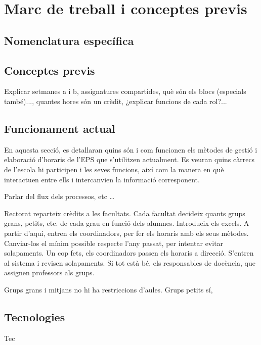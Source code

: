 \documentclass[a4paper,12pt]{ThesisStyle}
\begin{document}
\chapter{Marc de treball i conceptes previs}  %
\label{cap:marcdetreball}

\section{Nomenclatura específica}
\label{sec:nomenclatura}

\section{Conceptes previs}
\label{sec:conceptes_previs}
Explicar setmanes a i b, assignatures compartides, què són els blocs (especials també)..., quantes hores
són un crèdit, ¿explicar funcions de cada rol?...

\section{Funcionament actual}
\label{sec:funcionament_actual}

En aquesta secció, es detallaran quins són i com funcionen els mètodes de gestió i elaboració d'horaris de l'EPS que s'utilitzen actualment. Es veuran quins càrrecs de l'escola hi participen i les seves funcions, així com la manera en què interactuen entre ells i intercanvien la informació corresponent.

Parlar del flux dels processos, etc \ldots

Rectorat reparteix crèdits a les facultats. Cada facultat decideix quants grups grans, petits, etc. de cada grau en funció dels alumnes. Introdueix els excels.
A partir d'aquí, entren els coordinadors, per fer els horaris amb els seus mètodes. Canviar-los el mínim possible respecte l'any passat, per intentar evitar
solapaments. Un cop fets, els coordinadors passen els horaris a direcció. S'entren al sistema i revisen solapaments. Si tot està bé, els responsables de docència,
que assignen professors als grups.

Grups grans i mitjans no hi ha restriccions d'aules. Grups petits sí,

\section{Tecnologies}
\label{sec:tecnologies}

Tec
\end{document}
